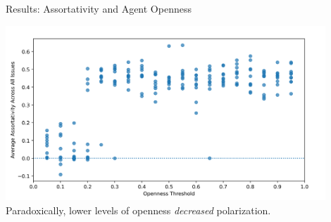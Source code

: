 \documentclass[12pt]{beamer}
\begin{document}
\begin{frame}[c]{Results: Assortativity and Agent Openness}  %

% 




\begin{center}
\includegraphics[width=0.9\textwidth]{images/AssortOpenness.png}
\small
Paradoxically, lower levels of openness \textit{decreased} polarization.
\end{center}

\end{frame}
\end{document}

